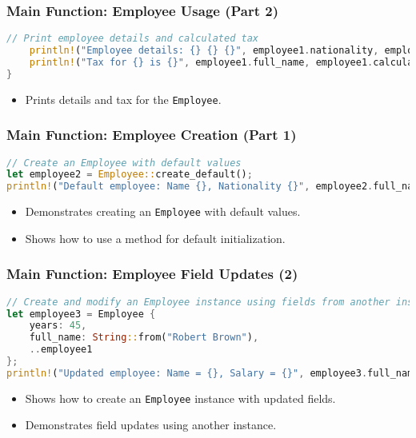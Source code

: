 \documentclass[aspectratio=169, table]{beamer}
\begin{document}
\begin{frame}[fragile]
\frametitle{Main Function: Employee Usage (Part 2)}
\begin{lstlisting}[language=Rust]
// Print employee details and calculated tax
	println!("Employee details: {} {} {}", employee1.nationality, employee1.years, employee1.sex);
	println!("Tax for {} is {}", employee1.full_name, employee1.calculate_tax());
}
\end{lstlisting}
\begin{itemize}
\item Prints details and tax for the \texttt{Employee}.
\end{itemize}
\end{frame}

\begin{frame}[fragile]
\frametitle{Main Function: Employee Creation (Part 1)}
\begin{lstlisting}[language=Rust]
// Create an Employee with default values
let employee2 = Employee::create_default();
println!("Default employee: Name {}, Nationality {}", employee2.full_name, employee2.nationality);
\end{lstlisting}
\begin{itemize}
\item Demonstrates creating an \texttt{Employee} with default values.
\item Shows how to use a method for default initialization.
\end{itemize}
\end{frame}

\begin{frame}[fragile]
\frametitle{Main Function: Employee Field Updates (2)}
\begin{lstlisting}[language=Rust]
// Create and modify an Employee instance using fields from another instance
let employee3 = Employee {
	years: 45,
	full_name: String::from("Robert Brown"),
	..employee1
};
println!("Updated employee: Name = {}, Salary = {}", employee3.full_name, employee3.income);
\end{lstlisting}
\begin{itemize}
\item Shows how to create an \texttt{Employee} instance with updated fields.
\item Demonstrates field updates using another instance.
\end{itemize}
\end{frame}
\end{document}
